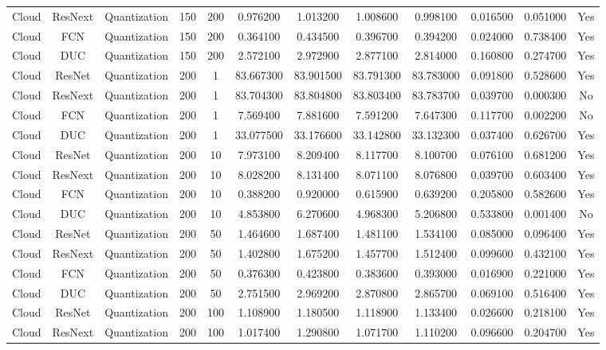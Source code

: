 \begin{tabular}{|c||c||c||c||c||c||c||c||c||c||c||c|}
Cloud & ResNext & Quantization & 150 & 200 & 0.976200 & 1.013200 & 1.008600 & 0.998100 & 0.016500 & 0.051000 & Yes \\
Cloud & FCN & Quantization & 150 & 200 & 0.364100 & 0.434500 & 0.396700 & 0.394200 & 0.024000 & 0.738400 & Yes \\
Cloud & DUC & Quantization & 150 & 200 & 2.572100 & 2.972900 & 2.877100 & 2.814000 & 0.160800 & 0.274700 & Yes \\
Cloud & ResNet & Quantization & 200 & 1 & 83.667300 & 83.901500 & 83.791300 & 83.783000 & 0.091800 & 0.528600 & Yes \\
Cloud & ResNext & Quantization & 200 & 1 & 83.704300 & 83.804800 & 83.803400 & 83.783700 & 0.039700 & 0.000300 & No \\
Cloud & FCN & Quantization & 200 & 1 & 7.569400 & 7.881600 & 7.591200 & 7.647300 & 0.117700 & 0.002200 & No \\
Cloud & DUC & Quantization & 200 & 1 & 33.077500 & 33.176600 & 33.142800 & 33.132300 & 0.037400 & 0.626700 & Yes \\
Cloud & ResNet & Quantization & 200 & 10 & 7.973100 & 8.209400 & 8.117700 & 8.100700 & 0.076100 & 0.681200 & Yes \\
Cloud & ResNext & Quantization & 200 & 10 & 8.028200 & 8.131400 & 8.071100 & 8.076800 & 0.039700 & 0.603400 & Yes \\
Cloud & FCN & Quantization & 200 & 10 & 0.388200 & 0.920000 & 0.615900 & 0.639200 & 0.205800 & 0.582600 & Yes \\
Cloud & DUC & Quantization & 200 & 10 & 4.853800 & 6.270600 & 4.968300 & 5.206800 & 0.533800 & 0.001400 & No \\
Cloud & ResNet & Quantization & 200 & 50 & 1.464600 & 1.687400 & 1.481100 & 1.534100 & 0.085000 & 0.096400 & Yes \\
Cloud & ResNext & Quantization & 200 & 50 & 1.402800 & 1.675200 & 1.457700 & 1.512400 & 0.099600 & 0.432100 & Yes \\
Cloud & FCN & Quantization & 200 & 50 & 0.376300 & 0.423800 & 0.383600 & 0.393000 & 0.016900 & 0.221000 & Yes \\
Cloud & DUC & Quantization & 200 & 50 & 2.751500 & 2.969200 & 2.870800 & 2.865700 & 0.069100 & 0.516400 & Yes \\
Cloud & ResNet & Quantization & 200 & 100 & 1.108900 & 1.180500 & 1.118900 & 1.133400 & 0.026600 & 0.218100 & Yes \\
Cloud & ResNext & Quantization & 200 & 100 & 1.017400 & 1.290800 & 1.071700 & 1.110200 & 0.096600 & 0.204700 & Yes \\

\end{tabular}
